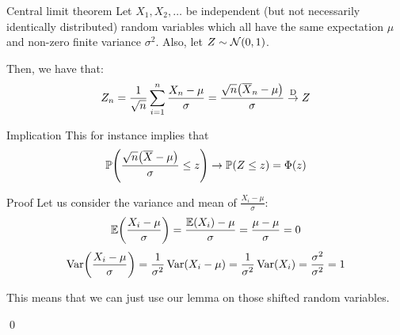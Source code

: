 \documentclass[a4paper]{article}
\begin{document}
\begin{parag}{Central limit theorem}
    Let $X_1, X_2, \ldots$ be independent (but not necessarily identically distributed) random variables which all have the same expectation $\mu$ and non-zero finite variance $\sigma^2$. Also, let $Z \followsdistr \mathcal{N}\left(0, 1\right)$.

    Then, we have that: 
    \[Z_n = \frac{1}{\sqrt{n}} \sum_{i=1}^{n} \frac{X_n - \mu}{\sigma} = \frac{\sqrt{n} \left(\bar{X}_n - \mu\right)}{\sigma} \over{\to}{D} Z\]
    
    \begin{subparag}{Implication}
        This for instance implies that 
        \[\prob\left(\frac{\sqrt{n}\left(\bar{X} - \mu\right)}{\sigma} \leq z\right) \to \prob\left(Z \leq z\right) = \Phi\left(z\right)\]
    \end{subparag}

    \begin{subparag}{Proof}
        Let us consider the variance and mean of $\frac{X_i - \mu}{\sigma}$: 
        \[\exval\left(\frac{X_i - \mu}{\sigma}\right) = \frac{\exval\left(X_i\right) - \mu}{\sigma} = \frac{\mu - \mu}{\sigma} = 0\]
        \[\Var\left(\frac{X_i - \mu}{\sigma}\right) = \frac{1}{\sigma^2} \Var\left(X_i - \mu\right) = \frac{1}{\sigma^2} \Var\left(X_i\right) = \frac{\sigma^2}{\sigma^2} = 1\]

        This means that we can just use our lemma on those shifted random variables.

        \qed
    \end{subparag}
\end{parag}
\end{document}
